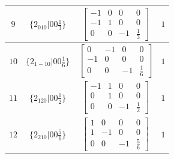 \documentclass[fleqn,8pt]{jsarticle}
\begin{document}
\begin{longtable}{cccc}
$ 9 $ & $ \{2{}_{010}|0 0 \frac{1}{3}\} $ & $ \begin{bmatrix} -1 & 0 & 0 & 0 \\ -1 & 1 & 0 & 0 \\ 0 & 0 & -1 & \frac{1}{3} \end{bmatrix} $ & $ 1 $ \\ \hline
$ 10 $ & $ \{2{}_{1-10}|0 0 \frac{1}{6}\} $ & $ \begin{bmatrix} 0 & -1 & 0 & 0 \\ -1 & 0 & 0 & 0 \\ 0 & 0 & -1 & \frac{1}{6} \end{bmatrix} $ & $ 1 $ \\ \hline
$ 11 $ & $ \{2{}_{120}|0 0 \frac{1}{2}\} $ & $ \begin{bmatrix} -1 & 1 & 0 & 0 \\ 0 & 1 & 0 & 0 \\ 0 & 0 & -1 & \frac{1}{2} \end{bmatrix} $ & $ 1 $ \\ \hline
$ 12 $ & $ \{2{}_{210}|0 0 \frac{5}{6}\} $ & $ \begin{bmatrix} 1 & 0 & 0 & 0 \\ 1 & -1 & 0 & 0 \\ 0 & 0 & -1 & \frac{5}{6} \end{bmatrix} $ & $ 1 $ \\
\end{longtable}
\end{document}
